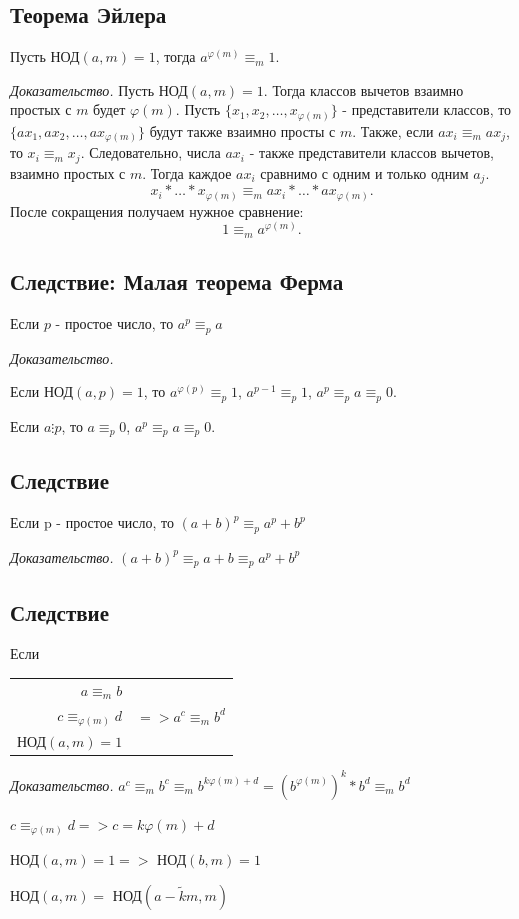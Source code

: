 \documentclass[12pt]{article}
\begin{document}
    \subsection{Теорема Эйлера}
    Пусть НОД$(a,m)=1$, тогда $a^{\varphi(m)}\equiv_{m}1.$
    \par \textit{Доказательство.} Пусть НОД$(a,m)=1.$ Тогда классов вычетов взаимно простых с $m$ будет $\varphi(m)$. Пусть $\{x_{1},x_{2},\dots,x_{\varphi(m)}\}$ - представители классов, то $\{ax_{1},ax_{2},\dots,ax_{\varphi(m)}\}$ будут также взаимно просты с $m$. Также, если $ax_{i}\equiv_{m} ax_{j}$, то $x_{i}\equiv_{m} x_{j}.$ Следовательно, числа $ax_{i}$ - также представители классов вычетов, взаимно простых с $m$. Тогда каждое $ax_{i}$ сравнимо с одним и только одним $a_{j}$. \[x_{i}*\dots*x_{\varphi(m)}\equiv_{m} ax_{i}*\dots*ax_{\varphi(m)}.\] После сокращения получаем нужное сравнение: \[1\equiv_{m} a^{\varphi(m)}.\]

    \subsection{Следствие: Малая теорема Ферма}
    Если $p$ - простое число, то $a^{p}\equiv_{p}a$
    \par \textit{Доказательство.}
    \par Если НОД$(a,p)=1$, то $a^{\varphi(p)}\equiv_{p}1$, $a^{p-1}\equiv_{p}1$, $a^{p}\equiv_{p}a\equiv_{p}0$.
    \par Если $a\vdots p$, то $a\equiv_{p}0$, $a^{p}\equiv_{p}a\equiv_{p}0$.

    \subsection{Следствие}
    Если p - простое число, то $(a+b)^{p}\equiv_{p}a^{p}+b^{p}$
    \par \textit{Доказательство.} $(a+b)^{p}\equiv_{p}a+b\equiv_{p}a^{p}+b^{p}$

    \subsection{Следствие}
    Если
    \begin{table}[h!]
        \begin{tabular}{r|c}
            $a\equiv_{m}b$                                     \\
            $c\equiv_{\varphi(m)}d$ & $=>a^{c}\equiv_{m}b^{d}$ \\
            НОД$(a,m)=1$
        \end{tabular}
    \end{table}
    \par \textit{Доказательство.} $a^{c}\equiv_{m}b^{c}\equiv_{m}b^{k\varphi(m)+d}=(b^{\varphi(m)})^{k}*b^{d}\equiv_{m}b^{d}$
    \par $c\equiv_{\varphi(m)}d=>c=k\varphi(m)+d$
    \par НОД$(a,m)=1=>$ НОД$(b,m)=1$
    \par НОД$(a,m)=$ НОД$(a-\widetilde{k}m,m)$
\end{document}
